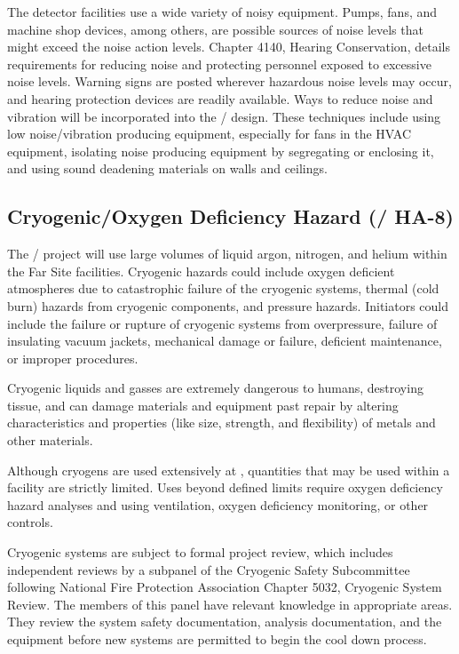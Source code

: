 The detector facilities use a wide variety of noisy equipment. Pumps,
fans, and machine shop devices, among others, are possible sources of
noise levels that might exceed the \fnal noise action levels. 
Chapter 4140, Hearing Conservation, details requirements for reducing
noise and protecting personnel exposed to excessive noise
levels. Warning signs are posted wherever hazardous noise levels may
occur, and hearing protection devices are readily
available. Ways to reduce noise and vibration will be
incorporated into the / design. These techniques include using
low noise/vibration producing equipment, especially for fans in the
HVAC equipment, isolating noise producing equipment by segregating
or enclosing it, and using sound deadening materials on walls and
ceilings.

\subsection{Cryogenic/Oxygen Deficiency Hazard (/ HA-8)}

The / project will use large volumes of liquid argon, nitrogen,
and helium within the Far Site facilities. Cryogenic hazards could
include oxygen deficient atmospheres due to
catastrophic failure of the cryogenic systems, thermal (cold burn)
hazards from cryogenic components, and pressure hazards. Initiators
could include the failure or rupture of cryogenic systems from
overpressure, failure of insulating vacuum jackets, mechanical damage
or failure, deficient maintenance, or improper procedures.

Cryogenic liquids and gasses are extremely dangerous to humans,
destroying tissue, and can damage materials and equipment past repair
by altering characteristics and properties (like size, strength, and
flexibility) of metals and other materials.

Although cryogens are used extensively at \fnal, quantities that may be used within a facility are strictly limited. Uses
beyond defined limits require oxygen deficiency hazard 
analyses and using ventilation, oxygen deficiency monitoring, or
other controls.

Cryogenic systems are subject to formal project review, which includes
independent reviews by a subpanel of the Cryogenic Safety Subcommittee
following National Fire Protection Association Chapter 5032, Cryogenic
System Review. The members of this panel have relevant knowledge in
appropriate areas. They review the system safety documentation,
 analysis documentation, and the equipment before new
systems are permitted to begin the cool down process.

